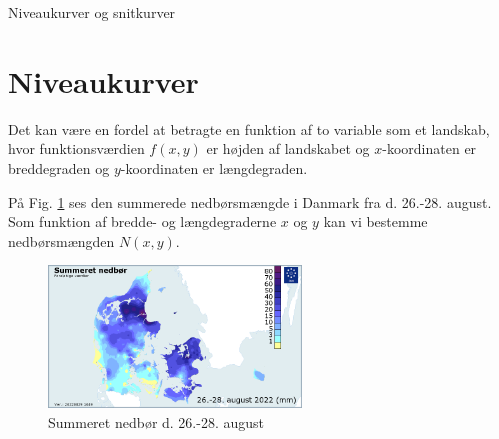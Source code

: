 \begin{center}
\Huge
Niveaukurver og snitkurver
\end{center}

\section*{Niveaukurver}

Det kan være en fordel at betragte en funktion af to variable som et landskab, hvor funktionsværdien $f(x,y)$ er højden af landskabet og $x$-koordinaten er breddegraden og $y$-koordinaten er længdegraden. 
\begin{exa}
	På Fig. \ref{fig:nedboer} ses den summerede nedbørsmængde i Danmark fra d. 26.-28. august. 
	Som funktion af bredde- og længdegraderne $x$ og $y$ kan vi bestemme nedbørsmængden
	$N(x,y)$. 
	\begin{figure}[H]
		\centering
		\includegraphics[width=0.6\textwidth]{Billeder/nedboer.png}
		\caption{Summeret nedbør d. 26.-28. august}
		\label{fig:nedboer}
	\end{figure}
\end{exa} 

